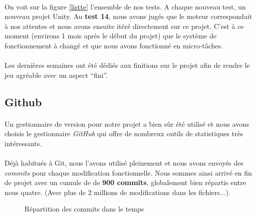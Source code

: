 \paragraph{}
On voit sur la figure \ref{listte} l'ensemble de nos tests. A chaque nouveau test, un nouveau projet Unity. Au \textbf{test 14}, nous avons jugés que le moteur correspondait à nos attentes et nous avons ensuite itéré directement sur ce projet. C’est à ce moment (environs 1 mois après le début du projet) que le système de fonctionnement à changé et que nous avons fonctionné en micro-tâches.

\paragraph{}
Les dernières semaines ont été dédiés aux finitions sur le projet afin de rendre le jeu agréable avec un aspect “fini”.

\subsection{Github}

\paragraph{}
Un gestionnaire de version pour notre projet a bien sûr été utilisé et nous avons choisis le gestionnaire \emph{GitHub} qui offre de nombreux outils de statistiques très intéressants.

\paragraph{}
Déjà habitués à Git, nous l'avons utilisé pleinement et nous avons envoyés des \emph{commits} pour chaque modification fonctionnelle. Nous sommes ainsi arrivé en fin de projet avec un cumule de de \textbf{900 commits}, globalement bien répartis entre nous quatre. (Avec plus de 2 millions de modifications dans les fichiers...).

\begin{figure}[H]\centering
  \caption{Répartition des commits dans le temps}
  \label{github_commits}
\end{figure}

